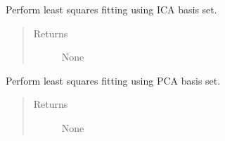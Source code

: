 \documentclass[a4paper,11pt,english]{sphinxmanual}
\begin{document}

\begin{fulllineitems}
\label{analysis:analysis.fitPSF.ICAleastSq}
Perform least squares fitting using ICA basis set.
\begin{quote}\begin{description}
\item[{Returns}] \leavevmode
None

\end{description}\end{quote}

\end{fulllineitems}


\begin{fulllineitems}
\label{analysis:analysis.fitPSF.PCAleastSQ}
Perform least squares fitting using PCA basis set.
\begin{quote}\begin{description}
\item[{Returns}] \leavevmode
None

\end{description}\end{quote}

\end{fulllineitems}

\end{document}
